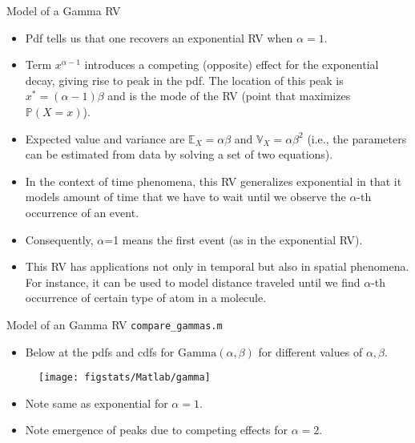 \documentclass[9pt]{beamer}
\begin{document}
%
\begin{frame}{Model of a Gamma RV}

\begin{itemize}
\setlength{\itemsep}{10pt}
\item Pdf tells us that one recovers an exponential RV when $\alpha=1$. 
\item Term $x^{\alpha-1}$ introduces a competing (opposite) effect for the exponential decay, giving rise to peak in the pdf. The location of this peak is $x^*=(\alpha-1)\beta$ and is the mode of the RV (point that maximizes $\mathbb{P}(X=x)$). 
\item Expected value and variance are $\mathbb{E}_X=\alpha\beta$ and $\mathbb{V}_X=\alpha\beta^2$ (i.e., the parameters can be estimated from data by solving a set of two equations). 
\item In the context of time phenomena, this RV generalizes exponential in that it models amount of time that we have to wait until we observe the $\alpha$-th occurrence of an event. 
\item Consequently, $\alpha$=1 means the first event (as in the exponential RV). 
\item This RV has applications not only in temporal but also in spatial phenomena. For instance, it can be used to model distance traveled until we find $\alpha$-th occurrence of certain type of atom in a molecule.  
\end{itemize}

\end{frame}


%
\begin{frame}{Model of an Gamma RV \footnotesize{\texttt{compare\_gammas.m}}}
\begin{itemize}
\setlength{\itemsep}{10pt}
\item Below at the pdfs and cdfs for $\textrm{Gamma}(\alpha,\beta)$ for different values of $\alpha,\beta$.
\end{itemize}
\begin{figure}[!htb]
    \centering
	\texttt{[image: figstats/Matlab/gamma]}
\end{figure}
\begin{itemize}
\setlength{\itemsep}{10pt}
\item Note same as exponential for $\alpha=1$.
\item Note emergence of peaks due to competing effects for $\alpha=2$. 
\end{itemize}
\end{frame}
\end{document}
